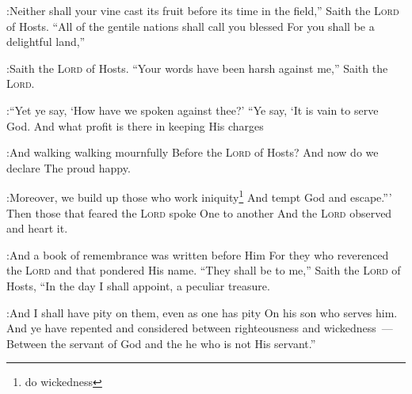 \begin{enumerate*}[mode=unboxed]
:Neither shall your vine cast its fruit before its time in the field,'' Saith the \textsc{Lord} of Hosts.%
     ``All of the gentile nations shall call you blessed For you shall be a delightful land,''%

:Saith the \textsc{Lord} of Hosts.%
     ``Your words have been harsh against me,'' Saith the \textsc{Lord}.%

:``Yet ye say, `How have we spoken against thee?'%
     ``Ye say, `It is vain to serve God. And what profit is there in keeping His charges%

:And walking walking mournfully Before the \textsc{Lord} of Hosts?%
     And now do we declare The proud happy.%

:Moreover, we build up those who work iniquity\footnote{do wickedness} And tempt God and escape.'''%
     Then those that feared the \textsc{Lord} spoke One to another And the \textsc{Lord} observed and heart it.%

:And a book of remembrance was written before Him For they who reverenced the \textsc{Lord} and that pondered His name.%
     ``They shall be to me,'' Saith the \textsc{Lord} of Hosts, ``In the day I shall appoint, a peculiar treasure.%

:And I shall have pity on them, even as one has pity On his son who serves him.%
     And ye have repented and considered between righteousness and wickedness~--- Between the servant of God and the he who is not His servant.''%
\end{enumerate*}
